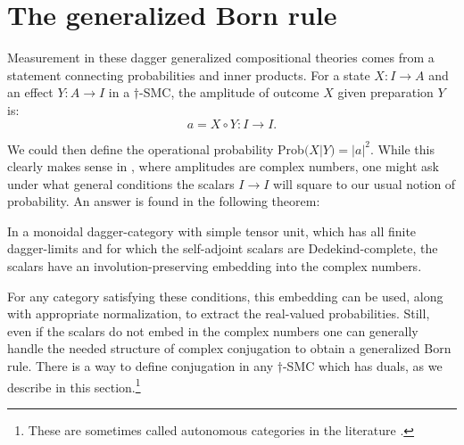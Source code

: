 \section{The generalized Born rule}
\label{sec:bornrule}
Measurement in these dagger generalized compositional theories comes from a statement connecting probabilities and inner products. For a state $X:I\to A$ and an effect $Y:A\to I$ in a $\dagger$-SMC, the amplitude of outcome $X$ given preparation $Y$ is:
\begin{equation}
a = X\circ Y:I\to I.
\end{equation}


\noindent We could then define the operational probability Prob$(X|Y)=|a|^2$. While this clearly makes sense in , where amplitudes are complex numbers, one might ask under what general conditions the scalars $I\to I$ will square to our usual notion of probability. An answer is found in the following theorem:
\begin{theorem}{\cite[Thm 4.2]{vicary2011completeness}}
In a monoidal dagger-category with simple tensor unit, which has all finite dagger-limits and for which the self-adjoint scalars are Dedekind-complete, the scalars have an involution-preserving embedding into the complex numbers.
\end{theorem}
\noindent For any category satisfying these conditions, this embedding can be used, along with appropriate normalization, to extract the real-valued probabilities. Still, even if the scalars do not embed in the complex numbers one can generally handle the needed structure of complex conjugation to obtain a generalized Born rule. There is a way to define conjugation in any $\dagger$-SMC which has duals, as we describe in this section.\footnote{These are sometimes called autonomous categories in the literature \cite{joyal1993braided,selinger2011survey}.}

